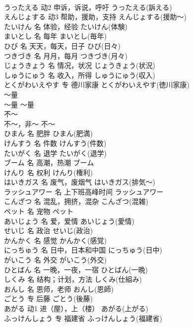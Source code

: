 \documentclass[8pt]{extreport}
\begin{document}
\begin{CJK}{UTF8}{min}
\\	うったえる	动2	申诉，诉说，呼吁	うったえる(訴える)	
\\	えんじょする	动3	帮助，援助，支持	えんじょする(援助～)	
\\	たいけん	名	体验，经验	たいけん(体験)	
\\	まいとし	名	每年	まいとし(毎年)	
\\	ひび	名	天天，每天，日子	ひび(日々)	
\\	つきづき	名	月月，每月	つきづき(月々)	
\\	じょうきょう	名	情况，状况	じょうきょう(状況)	
\\	しゅうにゅう	名	收入，所得	しゅうにゅう(収入)	
\\	とくがわいえやす	专	德川家康	とくがわいえやす(徳川家康)	
\\	～量	
\\	～量	～量	
\\	不～	
\\	不～，非～	不～	
\\	ひまん	名	肥胖	ひまん(肥満)	
\\	けんすう	名	件数	けんすう(件数)	
\\	たいがく	名	退学	たいがく(退学)	
\\	ブーム	名	高潮，热潮	ブーム	
\\	けんり	名	权利	けんり(権利)	
\\	はいきガス	名	废气，废烟气	はいきガス(排気～)	
\\	ラッシュアワー	名	上下班高峰时间	ラッシュアワー	
\\	こんざつ	名	混乱，拥挤，混杂	こんざつ(混雑)	
\\	ペット	名	宠物	ペット	
\\	あいじょう	名	爱，爱情	あいじょう(愛情)	
\\	せいじ	名	政治	せいじ(政治)	
\\	かんかく	名	感觉	かんかく(感覚)	
\\	にっちゅう	名	日中，日本和中国	にっちゅう(日中)	
\\	がいこう	名	外交	がいこう(外交)	
\\	ひとばん	名	一晚，一夜，一宿	ひとばん(一晩)	
\\	しくみ	名	结构；计划，方法	しくみ(仕組み)	
\\	おんし	名	恩师，老师	おんし(恩師)	
\\	ごとう	专	后藤	ごとう(後藤)	
\\	あがる	动1	进（屋），上（楼）	あがる(上がる)	
\\	ふっけんしょう	专	福建省	ふっけんしょう(福建省)	

\end{CJK}
\end{document}
